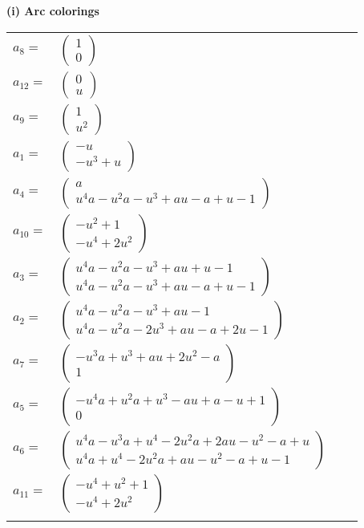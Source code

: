 \documentclass[1p]{elsarticle_modified}
\theoremstyle{definition}
\begin{document}
\flushleft \textbf{(i) Arc colorings}\\
\begin{tabular}{m{7pt} m{180pt} m{7pt} m{180pt} }
\flushright $a_{8}=$&$\begin{pmatrix}1\\0\end{pmatrix}$ \\
\flushright $a_{12}=$&$\begin{pmatrix}0\\u\end{pmatrix}$ \\
\flushright $a_{9}=$&$\begin{pmatrix}1\\u^2\end{pmatrix}$ \\
\flushright $a_{1}=$&$\begin{pmatrix}- u\\- u^3+u\end{pmatrix}$ \\
\flushright $a_{4}=$&$\begin{pmatrix}a\\u^4 a- u^2 a- u^3+a u- a+u-1\end{pmatrix}$ \\
\flushright $a_{10}=$&$\begin{pmatrix}- u^2+1\\- u^4+2 u^2\end{pmatrix}$ \\
\flushright $a_{3}=$&$\begin{pmatrix}u^4 a- u^2 a- u^3+a u+u-1\\u^4 a- u^2 a- u^3+a u- a+u-1\end{pmatrix}$ \\
\flushright $a_{2}=$&$\begin{pmatrix}u^4 a- u^2 a- u^3+a u-1\\u^4 a- u^2 a-2 u^3+a u- a+2 u-1\end{pmatrix}$ \\
\flushright $a_{7}=$&$\begin{pmatrix}- u^3 a+u^3+a u+2 u^2- a\\1\end{pmatrix}$ \\
\flushright $a_{5}=$&$\begin{pmatrix}- u^4 a+u^2 a+u^3- a u+a- u+1\\0\end{pmatrix}$ \\
\flushright $a_{6}=$&$\begin{pmatrix}u^4 a- u^3 a+u^4-2 u^2 a+2 a u- u^2- a+u\\u^4 a+u^4-2 u^2 a+a u- u^2- a+u-1\end{pmatrix}$ \\
\flushright $a_{11}=$&$\begin{pmatrix}- u^4+u^2+1\\- u^4+2 u^2\end{pmatrix}$\\&\end{tabular}
\end{document}
